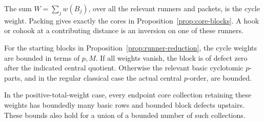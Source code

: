 The sum \(W=\sum_jw(B_j)\), over all the relevant runners and
packets, is the cycle weight.  Packing gives exactly the cores in
Proposition~\ref{prop:core-blocks}.  A hook or cohook at a contributing
distance is an inversion on one of these runners.

\begin{lemma}\label{run:defect-bounds}
For the starting blocks in Proposition~\ref{prop:runner-reduction},
the cycle weights are bounded in terms of \(p,M\).
If all weights vanish, the block is of defect zero after the
indicated central quotient.  Otherwise the relevant basic
cyclotomic \(p\)-parts, and in the regular classical case the actual
central \(p\)-order, are bounded.

In the positive-total-weight case, every endpoint core collection
retaining these weights has boundedly many basic rows and bounded
block defects upstairs.
These bounds also hold for a union of a bounded number of such
collections.
\end{lemma}


